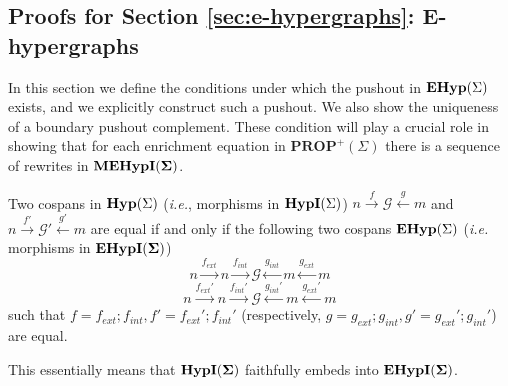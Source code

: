 \subsection{Proofs for Section \ref{sec:e-hypergraphs}: E-hypergraphs}
\label{sec:appendix:pushout}

In this section we define the conditions under which the pushout in $\mathbf{EHyp}(\Sigma)$ exists, and we explicitly construct such a pushout.
We also show the uniqueness of a boundary pushout complement.
These condition will play a crucial role in showing that for each enrichment equation in $\textbf{PROP}^{+}(\Sigma)$ there is a sequence of rewrites in ${\mathbf{MEHypI(\Sigma)}}$.

\begin{proposition}
    Two cospans in $\mathbf{Hyp}(\Sigma)$ (\textit{i.e.}, morphisms in $\textbf{HypI}(\Sigma)$) $n \xrightarrow{f} \mathcal{G} \xleftarrow{g} m$ and $n \xrightarrow{f'} \mathcal{G}' \xleftarrow{g'} m$ are equal if and only if
    the following two cospans  $\mathbf{EHyp}(\Sigma)$ (\textit{i.e.} morphisms in ${\mathbf{EHypI(\Sigma)}}$)
    \[
    n \xrightarrow{f_{ext}} n \xrightarrow{f_{int}} \mathcal{G} \xleftarrow{g_{int}} m \xleftarrow{g_{ext}} m
    \]
    \[
        n \xrightarrow{f_{ext}'} n \xrightarrow{f_{int}'} \mathcal{G} \xleftarrow{g_{int}'} m \xleftarrow{g_{ext}'} m    
    \]
    such that $f = f_{ext};f_{int}, f'=f_{ext}';f_{int}'$ (respectively, $g = g_{ext};g_{int}, g' = g_{ext}';g_{int}'$) are equal.
\end{proposition}
This essentially means that $\mathbf{\textbf{HypI}(\Sigma)}$ faithfully embeds into ${\mathbf{EHypI(\Sigma)}}$. 
